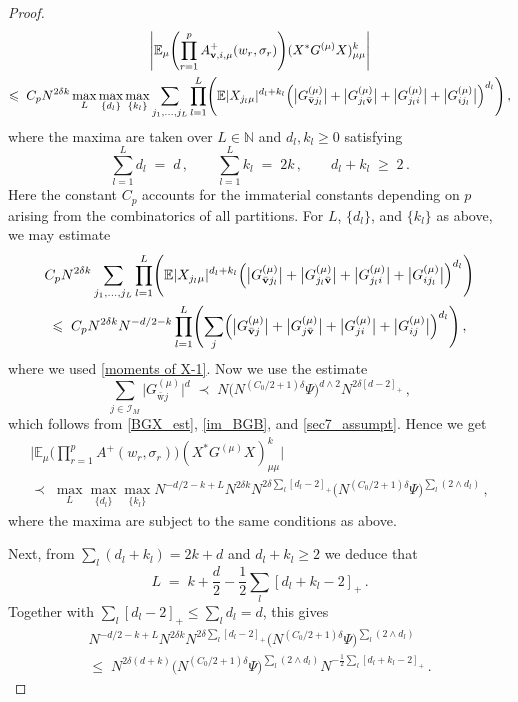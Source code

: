 \documentclass[11pt]{article} %
\numberwithin{equation}{section}
\numberwithin{figure}{section}
\theoremstyle{plain} %
\theoremstyle{definition} %
\newcommand{\f}[1]{\boldsymbol{\mathrm{#1}}} %
\renewcommand{\cal}{\mathcal}
\newcommand{\E}{\mathbb{E}}
\newcommand{\N}{\mathbb{N}}
\renewcommand{\leq}{\leqslant}
\renewcommand{\geq}{\geqslant}
\newcommand{\pb}[1]{\bigl({#1}\bigr)}
\newcommand{\pB}[1]{\Bigl({#1}\Bigr)}
\newcommand{\pBB}[1]{\Biggl({#1}\Biggr)}
\newcommand{\abs}[1]{\lvert #1 \rvert}
\newcommand{\absb}[1]{\bigl\lvert #1 \bigr\rvert}
\newcommand{\absBB}[1]{\Biggl\lvert #1 \Biggr\rvert}
\begin{document}
\begin{proof}
\begin{multline} \label{727}
\absBB{\E_\mu \pBB{\prod_{r = 1}^{p} A^+_{\f v, i,\mu}(w_r, \sigma_r)} (X^* G^{(\mu)} X)_{\mu \mu}^k}
\\
\leq\; C_p N^{2 \delta k} \max_{L} \max_{\{d_l\}} \max_{\{k_l\}} \sum_{j_1, \dots, j_L} \prod_{l = 1}^L \pBB{ \E \abs{X_{j_l \mu}}^{d_l + k_l} \pB{\absb{G^{(\mu)}_{\bar{\f v} j_l}} + \absb{G^{(\mu)}_{j_l \bar{\f v}}} + \absb{G^{(\mu)}_{j_l i}} + \absb{G^{(\mu)}_{i j_l}}}^{d_l}}\,,
\end{multline}
where the maxima are taken over $L \in \N$ and $d_l,k_l \geq 0$ satisfying
\begin{equation} \label{max_cond}
\sum_{l = 1}^L d_l \;=\; d \,, \qquad \sum_{l = 1}^L k_l \;=\; 2k \,, \qquad d_l + k_l \;\geq\; 2\,.
\end{equation}
Here the constant $C_p$ accounts for the immaterial constants depending on $p$ arising from the combinatorics of all partitions. For $L$, $\{d_l\}$, and $\{k_l\}$ as above, we may estimate
\begin{multline*}
C_p N^{2 \delta k} \sum_{j_1, \dots, j_L} \prod_{l = 1}^L \pBB{ \E \abs{X_{j_l \mu}}^{d_l + k_l} \pB{\absb{G^{(\mu)}_{\bar{\f v} j_l}} + \absb{G^{(\mu)}_{j_l \bar{\f v}}} + \absb{G^{(\mu)}_{j_l i}} + \absb{G^{(\mu)}_{i j_l}}}^{d_l}}
\\
\leq\; C_p N^{2 \delta k} N^{-d/2 - k} \prod_{l = 1}^L \pBB{ \sum_j \pB{\absb{G^{(\mu)}_{\bar{\f v} j}} + \absb{G^{(\mu)}_{j \bar{\f v}}} + \absb{G^{(\mu)}_{j i}} + \absb{G^{(\mu)}_{i j}}}^{d_l}}\,,
\end{multline*}
where we used \eqref{moments of X-1}.
Now we use the estimate
\begin{equation} \label{bound_sum_hat}
\sum_{j \in \cal I_M} \absb{G^{(\mu)}_{\bar{\f w} j}}^d \;\prec\; N \pb{N^{(C_0/2 + 1) \delta} \Psi}^{d \wedge 2} N^{2 \delta [d - 2]_+}\,,
\end{equation}
which follows from \eqref{BGX_est}, \eqref{im_BGB}, and \eqref{sec7_assumpt}. Hence we get
\begin{multline} \label{730}
\absBB{\E_\mu \pBB{\prod_{r = 1}^{p} A^+(w_r, \sigma_r)} (X^* G^{(\mu)} X)_{\mu \mu}^k}
\\
\prec\;
\max_{L} \max_{\{d_l\}} \max_{\{k_l\}} N^{-d/2 - k + L} N^{2 \delta k} N^{2 \delta \sum_l [d_l - 2]_+} \pb{N^{(C_0/2 + 1) \delta} \Psi}^{\sum_l (2 \wedge d_l)}\,,
\end{multline}
where the maxima are subject to the same conditions as above.

Next, from $\sum_l (d_l + k_l) = 2k + d$ and $d_l + k_l \geq 2$ we deduce that
\begin{equation*}
L \;=\; k + \frac{d}{2} - \frac{1}{2} \sum_l [d_l + k_l - 2]_+\,.
\end{equation*}
Together with $\sum_l [d_l - 2]_+ \leq \sum_l d_l = d$, this gives
\begin{multline}
N^{-d/2 - k + L} N^{2 \delta k} N^{2 \delta \sum_l [d_l - 2]_+} \pb{N^{(C_0/2 + 1) \delta} \Psi}^{\sum_l (2 \wedge d_l)}
\\
\leq\; N^{2 \delta (d+k)} \pb{N^{(C_0/2 + 1) \delta} \Psi}^{\sum_l (2 \wedge d_l)} N^{-\frac{1}{2} \sum_l [d_l + k_l - 2]_+}\,.
\end{multline}


\end{proof}
\end{document}
